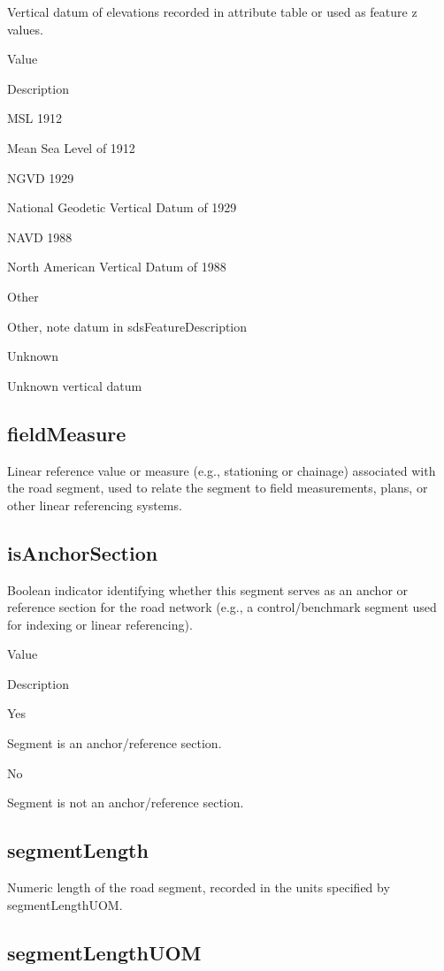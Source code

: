 \documentclass[
  letterpaper,
  DIV=11,
  numbers=noendperiod]{scrreprt}
\begin{document}
Vertical datum of elevations recorded in attribute table or used as
feature z values.

Value

Description

MSL 1912

Mean Sea Level of 1912

NGVD 1929

National Geodetic Vertical Datum of 1929

NAVD 1988

North American Vertical Datum of 1988

Other

Other, note datum in sdsFeatureDescription

Unknown

Unknown vertical datum

\subsection{fieldMeasure}\label{fieldmeasure}

Linear reference value or measure (e.g., stationing or chainage)
associated with the road segment, used to relate the segment to field
measurements, plans, or other linear referencing systems.

\subsection{isAnchorSection}\label{isanchorsection}

Boolean indicator identifying whether this segment serves as an anchor
or reference section for the road network (e.g., a control/benchmark
segment used for indexing or linear referencing).

Value

Description

Yes

Segment is an anchor/reference section.

No

Segment is not an anchor/reference section.

\subsection{segmentLength}\label{segmentlength}

Numeric length of the road segment, recorded in the units specified by
segmentLengthUOM.

\subsection{segmentLengthUOM}\label{segmentlengthuom}
\end{document}

